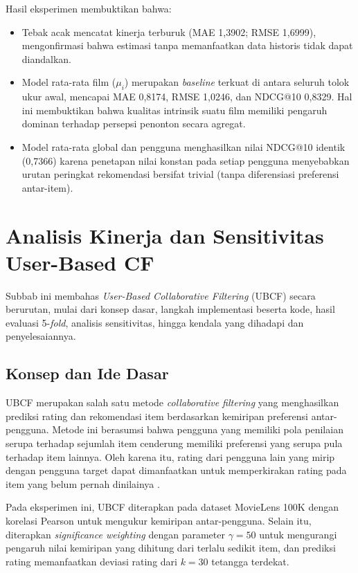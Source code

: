 Hasil eksperimen membuktikan bahwa:
\begin{itemize}
    \item Tebak acak mencatat kinerja terburuk (MAE 1,3902; RMSE 1,6999), mengonfirmasi bahwa estimasi tanpa memanfaatkan data historis tidak dapat diandalkan.
    \item Model rata-rata film ($\mu_i$) merupakan \textit{baseline} terkuat di antara seluruh tolok ukur awal, mencapai MAE 0,8174, RMSE 1,0246, dan NDCG@10 0,8329. Hal ini membuktikan bahwa kualitas intrinsik suatu film memiliki pengaruh dominan terhadap persepsi penonton secara agregat.
    \item Model rata-rata global dan pengguna menghasilkan nilai NDCG@10 identik (0,7366) karena penetapan nilai konstan pada setiap pengguna menyebabkan urutan peringkat rekomendasi bersifat trivial (tanpa diferensiasi preferensi antar-item).
\end{itemize}

\section{Analisis Kinerja dan Sensitivitas User-Based CF}
\label{sec:ubcf}
Subbab ini membahas \textit{User-Based Collaborative Filtering} (UBCF) secara berurutan, mulai dari konsep dasar, langkah implementasi beserta kode, hasil evaluasi 5-\textit{fold}, analisis sensitivitas, hingga kendala yang dihadapi dan penyelesaiannya.

\subsection{Konsep dan Ide Dasar}
UBCF merupakan salah satu metode \textit{collaborative filtering} yang menghasilkan prediksi rating dan rekomendasi item berdasarkan kemiripan preferensi antar-pengguna. Metode ini berasumsi bahwa pengguna yang memiliki pola penilaian serupa terhadap sejumlah item cenderung memiliki preferensi yang serupa pula terhadap item lainnya. Oleh karena itu, rating dari pengguna lain yang mirip dengan pengguna target dapat dimanfaatkan untuk memperkirakan rating pada item yang belum pernah dinilainya \citep{jannach2010recommender}.

Pada eksperimen ini, UBCF diterapkan pada dataset MovieLens 100K dengan korelasi Pearson untuk mengukur kemiripan antar-pengguna. Selain itu, diterapkan \textit{significance weighting} dengan parameter $\gamma = 50$ untuk mengurangi pengaruh nilai kemiripan yang dihitung dari terlalu sedikit item, dan prediksi rating memanfaatkan deviasi rating dari $k = 30$ tetangga terdekat.

